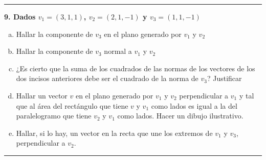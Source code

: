 \documentclass{article}
\begin{document}
\hrule
\vspace{10 pt}
\textbf{9. Dados $v_1 = (3, 1, 1)$, $v_2 = (2, 1, -1)$ y $v_3 = (1, 1, -1)$}

\begin{enumerate}[(a)]
\bfseries
\item Hallar la componente de $v_3$ en el plano generado por $v_1$ y $v_2$

\item Hallar la componente de $v_3$ normal a $v_1$ y $v_2$

\item ¿Es cierto que la suma de los cuadrados de las normas de los vectores de los dos incisos anteriores debe ser el cuadrado de la norma de $v_3$? Justificar

\item Hallar un vector $v$ en el plano generado por $v_1$ y $v_2$ perpendicular a $v_1$ y tal que al área del rectángulo que tiene $v$ y $v_1$ como lados es igual a la del paralelogramo que tiene $v_2$ y $v_1$ como lados. Hacer un dibujo ilustrativo.

\item Hallar, si lo hay, un vector en la recta que une los extremos de $v_1$ y $v_3$, perpendicular a $v_2$. 
\end{enumerate}
\hrule
\end{document}
